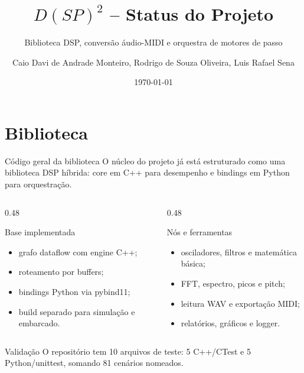\documentclass{beamer}
\title{\texorpdfstring{$D(SP)^2$}{DSP2} -- Status do Projeto}
\subtitle{Biblioteca DSP, conversão áudio-MIDI e orquestra de motores de passo}
\author{Caio Davi de Andrade Monteiro, Rodrigo de Souza Oliveira, Luis Rafael Sena}
\institute{Engenharia Eletrônica e de Computação}
\date{\today}
\begin{document}
\begin{frame}
    \titlepage
\end{frame}

\section{Biblioteca}

\begin{frame}{Código geral da biblioteca}
    O núcleo do projeto já está estruturado como uma biblioteca DSP híbrida:
    core em C++ para desempenho e bindings em Python para orquestração.

    \vspace{0.25cm}

    \begin{columns}[T,onlytextwidth]
        \begin{column}{0.48\textwidth}
            \begin{block}{Base implementada}
                \begin{itemize}
                    \item grafo dataflow com engine C++;
                    \item roteamento por buffers;
                    \item bindings Python via pybind11;
                    \item build separado para simulação e embarcado.
                \end{itemize}
            \end{block}
        \end{column}
        \begin{column}{0.48\textwidth}
            \begin{block}{Nós e ferramentas}
                \begin{itemize}
                    \item osciladores, filtros e matemática básica;
                    \item FFT, espectro, picos e pitch;
                    \item leitura WAV e exportação MIDI;
                    \item relatórios, gráficos e logger.
                \end{itemize}
            \end{block}
        \end{column}
    \end{columns}

    \vspace{0.15cm}

    \begin{alertblock}{Validação}
        O repositório tem 10 arquivos de teste: 5 C++/CTest e 5 Python/unittest,
        somando 81 cenários nomeados.
    \end{alertblock}
\end{frame}
\end{document}
